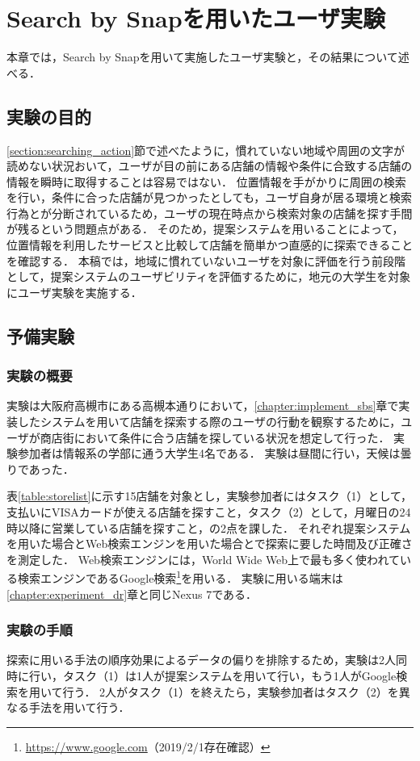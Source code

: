 \chapter{Search by Snapを用いたユーザ実験}
\label{chapter:experiment_sbs}
本章では，Search by Snapを用いて実施したユーザ実験と，その結果について述べる．
\section{実験の目的}
  \ref{section:searching_action}節で述べたように，慣れていない地域や周囲の文字が読めない状況おいて，ユーザが目の前にある店舗の情報や条件に合致する店舗の情報を瞬時に取得することは容易ではない．
  位置情報を手がかりに周囲の検索を行い，条件に合った店舗が見つかったとしても，ユーザ自身が居る環境と検索行為とが分断されているため，ユーザの現在時点から検索対象の店舗を探す手間が残るという問題点がある．
  そのため，提案システムを用いることによって，位置情報を利用したサービスと比較して店舗を簡単かつ直感的に探索できることを確認する．
  本稿では，地域に慣れていないユーザを対象に評価を行う前段階として，提案システムのユーザビリティを評価するために，地元の大学生を対象にユーザ実験を実施する．

\section{予備実験}
  \subsection{実験の概要}
    実験は大阪府高槻市にある高槻本通りにおいて，\ref{chapter:implement_sbs}章で実装したシステムを用いて店舗を探索する際のユーザの行動を観察するために，ユーザが商店街において条件に合う店舗を探している状況を想定して行った．
    実験参加者は情報系の学部に通う大学生4名である．
    実験は昼間に行い，天候は曇りであった．

    表\ref{table:storelist}に示す15店舗を対象とし，実験参加者にはタスク（1）として，支払いにVISAカードが使える店舗を探すこと，タスク（2）として，月曜日の24時以降に営業している店舗を探すこと，の2点を課した．
    それぞれ提案システムを用いた場合とWeb検索エンジンを用いた場合とで探索に要した時間及び正確さを測定した．
    Web検索エンジンには，World Wide Web上で最も多く使われている検索エンジン\cite{Alexa:2019}であるGoogle検索\footnote{\url{https://www.google.com}（2019/2/1存在確認）}を用いる．
    実験に用いる端末は\ref{chapter:experiment_dr}章と同じNexus 7である．
    
  \subsection{実験の手順}
    探索に用いる手法の順序効果によるデータの偏りを排除するため，実験は2人同時に行い，タスク（1）は1人が提案システムを用いて行い，もう1人がGoogle検索を用いて行う．
    2人がタスク（1）を終えたら，実験参加者はタスク（2）を異なる手法を用いて行う．

